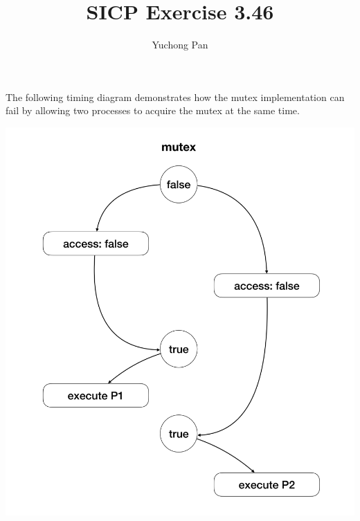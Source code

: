 \documentclass[11pt, oneside]{article}
\title{SICP Exercise 3.46}
\author{Yuchong Pan}
\begin{document}
\maketitle

The following timing diagram demonstrates how the mutex implementation can fail by allowing two processes to acquire the mutex at the same time.

\begin{center}
    \includegraphics[width=.7\textwidth,height=.7\textheight,keepaspectratio]{1.png}
\end{center}
\end{document}
